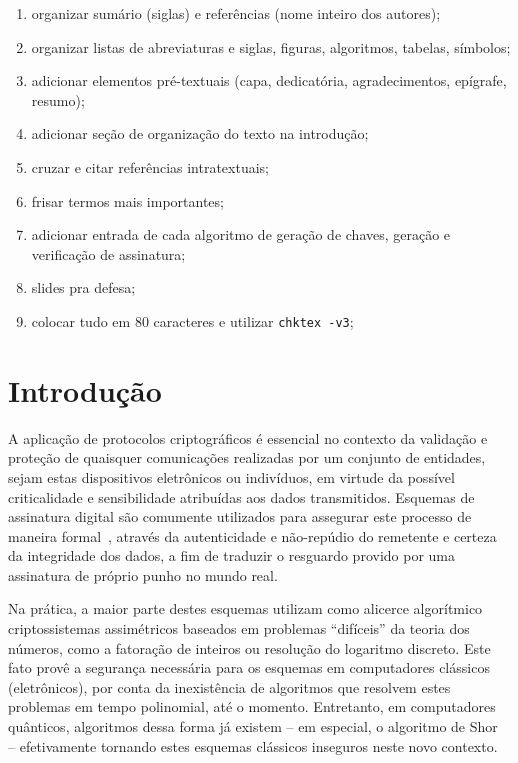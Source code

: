\documentclass[12pt,notitlepage]{report}
\begin{document}
{\large
\begin{enumerate}
    \item organizar sumário (siglas) e referências (nome inteiro dos autores);
    \item organizar listas de abreviaturas e siglas, figuras, algoritmos, tabelas, símbolos;
    \item adicionar elementos pré-textuais (capa, dedicatória, agradecimentos, epígrafe, resumo);
    \item adicionar seção de organização do texto na introdução;
    \item cruzar e citar referências intratextuais;
    \item frisar termos mais importantes;
    \item adicionar entrada de cada algoritmo de geração de chaves, geração e verificação de assinatura;
    \item slides pra defesa;
    \item colocar tudo em 80 caracteres e utilizar \texttt{chktex -v3};
\end{enumerate}
}

\newpage

\chapter{Introdução}

A aplicação de protocolos criptográficos é essencial no contexto da validação e
proteção de quaisquer comunicações realizadas por um conjunto de entidades,
sejam estas dispositivos eletrônicos ou indivíduos, em virtude da possível
criticalidade e sensibilidade atribuídas aos dados transmitidos. Esquemas de
assinatura digital são comumente utilizados para assegurar este processo de
maneira formal~\cite{Goldreich:2004:FCV:975541}, através da autenticidade e
não-repúdio do remetente e certeza da integridade dos dados, a fim de traduzir
o resguardo provido por uma assinatura de próprio punho no mundo real.

Na prática, a maior parte destes esquemas utilizam como alicerce algorítmico
criptossistemas assimétricos baseados em problemas ``difíceis'' da teoria dos
números, como a fatoração de inteiros ou resolução do logaritmo discreto.
Este fato provê a segurança necessária para os esquemas
em computadores clássicos (eletrônicos), por conta da inexistência de
algoritmos que resolvem estes problemas em tempo polinomial, até o momento.
Entretanto, em computadores quânticos, algoritmos dessa forma já existem -- em
especial, o algoritmo de Shor~\cite{Shor:1997:PAP:264393.264406} --
efetivamente tornando estes esquemas clássicos inseguros neste novo contexto.
\end{document}
